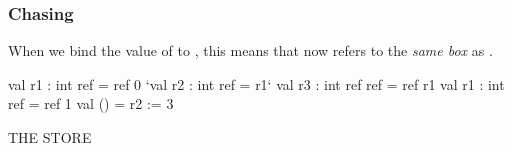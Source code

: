 \documentclass[aspectratio=169, handout]{beamer}
\newcommand{\topthing}[2]{
      \begin{minipage}[t][#1][t]{\textwidth}
        \vspace{\fill}
        #2
        \vspace{\fill}
      \end{minipage}
    }
\begin{document}
\begin{frame}[fragile]
  \frametitle{ Chasing}

  \topthing{0.2in}{
    When we bind the value of  to \code{r2}, this means that \code{r2}
    now refers to the \textit{same box} as \code{r1}.
  }

  \vspace{10pt}

  \begin{center}
    \begin{minipage}[t][2.1in][t]{0.6\textwidth}
      \vspace{\fill}
      \begin{codeblock}
        val r1 : int ref     = ref 0
        `val r2 : int ref     = r1`
        val r3 : int ref ref = ref r1
        val r1 : int ref     = ref 1
        val ()               = r2 := 3
      \end{codeblock}
      \vspace{\fill}
    \end{minipage}
    \hfill\vline\hfill
    \begin{minipage}[t][2.1in][t]{0.3\textwidth}
      \centering
      {\hspace{-20pt}\color{gray} \large THE STORE}

      \vspace{\fill}
      \vspace{\fill}
    \end{minipage}
  \end{center}
\end{frame}
\end{document}
